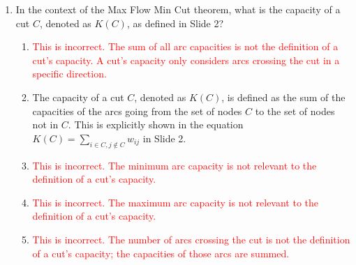 \documentclass{article}%
\newcommand{\incorrect}[1]{\textcolor{red}{#1}}
\begin{document}
\begin{enumerate}
\begin{enumerate}
\begin{enumerate}
\end{enumerate}%
\vspace{0.5em}%
\item What is the practical significance of the Max Flow Min Cut theorem in solving network flow problems?%
\begin{enumerate}%
\item \incorrect{This is incorrect; the theorem is used in conjunction with linear programming techniques.}%
\item The theorem provides a powerful tool for solving max-flow problems, often offering more efficient solution methods than directly solving the associated linear program.%
\item \incorrect{This is incorrect; the theorem often simplifies the solution process.}%
\item \incorrect{This is incorrect; the theorem is applicable to networks of various sizes.}%
\item \incorrect{This is incorrect; the theorem is a cornerstone of network flow optimization.}%
\end{enumerate}%
\vspace{0.5em}%
\end{enumerate}%
\item In the context of the Max Flow Min Cut theorem, what is the capacity of a cut $C$, denoted as $K(C)$, as defined in Slide 2?%
\begin{enumerate}%
\item \incorrect{This is incorrect.  The sum of all arc capacities is not the definition of a cut's capacity. A cut's capacity only considers arcs crossing the cut in a specific direction.}%
\item The capacity of a cut $C$, denoted as $K(C)$, is defined as the sum of the capacities of the arcs going from the set of nodes $C$ to the set of nodes not in $C$. This is explicitly shown in the equation $K(C) = \sum_{i \in C, j \notin C} w_{ij}$ in Slide 2.%
\item \incorrect{This is incorrect. The minimum arc capacity is not relevant to the definition of a cut's capacity.}%
\item \incorrect{This is incorrect. The maximum arc capacity is not relevant to the definition of a cut's capacity.}%
\item \incorrect{This is incorrect. The number of arcs crossing the cut is not the definition of a cut's capacity; the capacities of those arcs are summed.}%
\end{enumerate}%
\vspace{1em}%

\end{enumerate}
\end{document}
